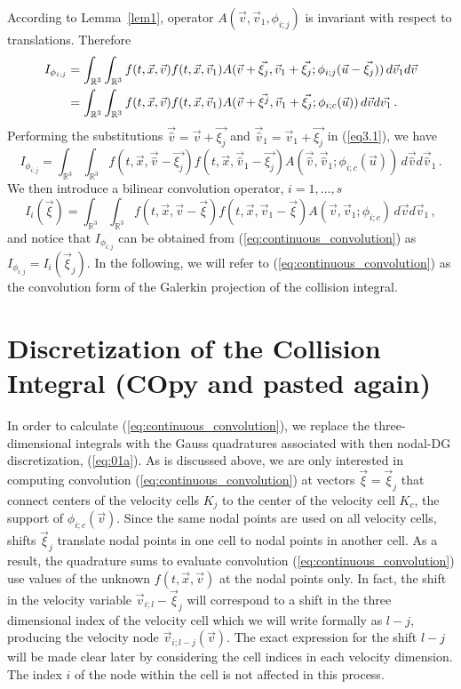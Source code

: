 \documentclass[12pt]{CSUNthesis}
\def\R{\mathbb{R}}
\def\R{\mathbb{R}}
\begin{document}
According to  Lemma~{\ref{lem1}}, operator $A(\vec{v},\vec{v}_1,\phi_{i;j})$ is invariant with respect to translations. Therefore
\begin{align}
\label{eq3.1}
I_{\phi_{i;j}} &= \int_{\R^3}\int_{\R^3} f(t,\vec{x},\vec{v})f(t,\vec{x},\vec{v}_{1})A(\vec{v}+\vec{\xi_{j}},\vec{v}_1+\vec{\xi_{j}}; \phi_{i;j}(\vec{u} - \vec{\xi_{j}})) \, d\vec{v}_{1} d\vec{v} \notag\\
 &= \int_{\R^3}\int_{\R^3} f(t,\vec{x},\vec{v})f(t,\vec{x},\vec{v}_{1})A(\vec{v}+\vec{\xi^{j}},\vec{v}_{1}+\vec{\xi_{j}}; \phi_{i;c}(\vec{u})) \, d\vec{v} d\vec{v_{1}} \, .
\end{align}
Performing the substitutions $\vec{\hat{v}} = \vec{v}+\vec{\xi_{j}} $ and $ \vec{\hat{v}}_1 = \vec{v}_{1}+\vec{\xi_{j}}$ in (\ref{eq3.1}), we have
\begin{equation*}
I_{\phi_{i;j}} = \int_{\R^3}\int_{\R^3} f(t,\vec{x},\vec{\hat{v}}-\vec{\xi_{j}}) f(t,\vec{x},\vec{\hat{v}}_1-\vec{\xi_{j}}) A(\vec{\hat{v}},\vec{\hat{v}}_{1};\phi_{i;c}(\vec{u})) \, d\vec{\hat{v}} d\vec{\hat{v}}_1 \, .
\end{equation*}
We then introduce a bilinear convolution operator, $i=1,\ldots,s$
\begin{equation}
\label{eq:continuous_convolution}
I_i(\vec{\xi}) = \int_{\R^3}\int_{\R^3} f(t,\vec{x},\vec{v}-\vec{\xi})f(t,\vec{x},\vec{v}_{1}-\vec{\xi})A(\vec{v},\vec{v}_{1}; \phi_{i;c}) \, d\vec{v} d\vec{v}_{1} \, ,
\end{equation}
and notice that $I_{\phi_{i;j}}$ can be obtained from (\ref{eq:continuous_convolution}) as
$I_{\phi_{i;j}}=I_i(\vec{\xi}_j)$. In the following, we will refer to (\ref{eq:continuous_convolution}) 
as the convolution form of the Galerkin projection of the collision integral.

\section{Discretization of the Collision Integral (COpy and pasted again)}
In order to calculate (\ref{eq:continuous_convolution}), we replace the three-dimensional integrals with the Gauss quadratures associated with then nodal-DG discretization, (\ref{eq:01a}). 
As is discussed above, we are only interested in 
computing convolution (\ref{eq:continuous_convolution}) at vectors 
$\vec{\xi}=\vec{\xi}_{j}$ that connect centers of the velocity cells $K_j$ to the 
center of the velocity cell $K_c$, the support of $\phi_{i;c}(\vec{v})$. Since the 
same nodal points are used on all velocity cells, shifts $\vec{\xi}_{j}$ 
translate nodal points in one cell to nodal points 
in another cell. As a result, the quadrature sums to evaluate convolution (\ref{eq:continuous_convolution})
use values of the unknown $f(t,\vec{x},\vec{v})$ at the nodal points
only. In fact, the shift in the velocity variable 
$\vec{v}_{i;l}-\vec{\xi}_{j}$ will correspond 
to a shift in the three dimensional index of the velocity cell 
which we will write formally as $l-j$, 
producing the velocity node $\vec{v}_{i;l-j}(\vec{v})$. The exact expression 
for the shift $l-j$ will be made clear later by considering the cell indices in 
each velocity dimension. The index $i$ of the node within the cell is not 
affected in this process. 
\end{document}
